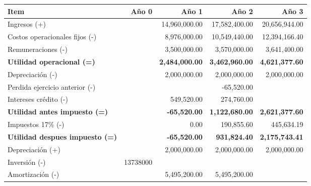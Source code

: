\begin{enumerate}[(a)]
          \begin{table}[h!t]
                \centering
                \footnotesize                
                \begin{tabular}{|l|r|r|r|r|}
                    \hline
                    {\bf Item}                               & {\bf Año 0}   & {\bf Año 1 }  & {\bf Año 2}   & {\bf Año 3}   \\\hline
                    {    Ingresos (+)}                       &               & 14,960,000.00 & 17,582,400.00 & 20,656,944.00 \\\hline
                    {    Costos operacionales fijos (-)}     &               &  8,976,000.00 & 10,549,440.00 & 12,394,166.40 \\\hline
                    {    Remuneraciones (-)}                 &               &  3,500,000.00 &  3,570,000.00 &  3,641,400.00 \\\hline
                    {\bf Utilidad operacional (=)}           &               &{\bf 2,484,000.00} &{\bf 3,462,960.00} &{\bf 4,621,377.60} \\\hline
                    {    Depreciación (-)}                   &               &  2,000,000.00 &  2,000,000.00 &  2,000,000.00 \\\hline
                    {    Perdida ejercicio anterior (-)}     &               &               &    -65,520.00 &               \\\hline
                    {    Intereses crédito (-)}              &               &    549,520.00 &    274,760.00 &               \\\hline
                    {\bf Utilidad antes impuesto (=)}        &               &{\bf-65,520.00}&{\bf 1,122,680.00} &{\bf 2,621,377.60} \\\hline
                    {    Impuestos 17\% (-)}                 &               &          0.00 &    190,855.60 &    445,634.19 \\\hline
                    {\bf Utilidad despues impuesto (=)}      &               &{\bf-65,520.00}&{\bf 931,824.40}&{\bf 2,175,743.41} \\\hline
                    {    Depreciación (+)}                   &               &  2,000,000.00 &  2,000,000.00 &  2,000,000.00 \\\hline
                    {    Inversión (-)}                      & 13738000      &               &               &               \\\hline
                    {    Amortización (-)}                   &               &  5,495,200.00 &  5,495,200.00 &               \\\hline

\end{tabular}
\end{table}
\end{enumerate}

